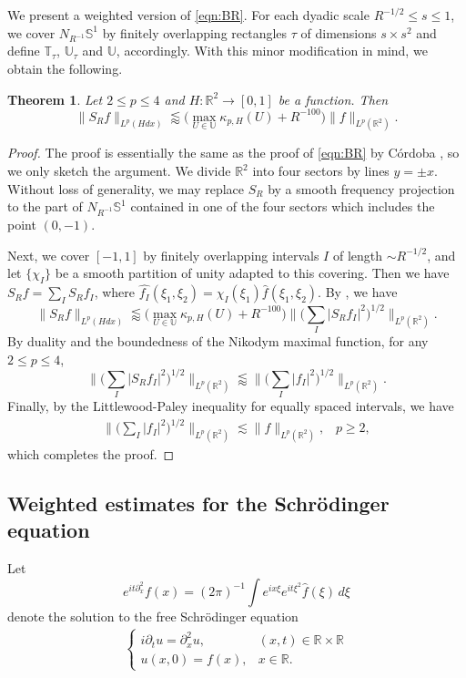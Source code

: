 \documentclass[11pt]{amsart}
\newtheorem{theorem}{Theorem}[section]
\theoremstyle{definition}
\theoremstyle{remark}
\renewcommand{\hat}{\widehat}
\newcommand{\R}{\mathbb{R}}
\newcommand{\T}{\mathbb{T}}
\newcommand{\U}{\mathbb{U}}
\newcommand{\les}{\lesssim}
\newcommand{\less}{\lessapprox}
\begin{document}
We present a weighted version of \eqref{eqn:BR}. For each dyadic scale $R^{-1/2}\leq s\leq 1$, we cover $N_{R^{-1}}\mathbb{S}^1$ by finitely overlapping rectangles $\tau$ of dimensions $s\times s^2$ and define $\T_\tau$, $\U_\tau$ and $\U$, accordingly. With this minor modification in mind, we obtain the following. 
\begin{theorem}\label{thm:BR}
Let $2\leq p\leq 4$ and $H:\R^2 \to [0,1]$ be a function. Then 
\[ 
			\| S_R f\|_{L^p(Hd x)} \less  \big(\max_{U\in \U} \kappa_{p,H}(U) + R^{-100} \big)   \| f\|_{L^p(\R^2)} .
\]	
\end{theorem}
\begin{proof}
	The proof is essentially the same as the proof of \eqref{eqn:BR}  by C\'{o}rdoba \cite{Co}, so we only  sketch the argument. We divide $\R^2$ into four sectors by lines $y=\pm x$. Without loss of generality, we may replace $S_R$ by a smooth frequency projection to the part of $N_{R^{-1}}\mathbb{S}^1$ contained in one of the four sectors which includes the point $(0,-1)$.  
	
	Next, we cover $[-1,1]$ by finitely overlapping intervals $I$ of length $\sim R^{-1/2}$, and let $\{ \chi_I\}$ be a smooth partition of unity adapted to this covering. Then we have $S_R f=\sum_{I} S_R f_I$, where $\hat{f_I}(\xi_1,\xi_2) =  \chi_I(\xi_1) \hat{f}(\xi_1,\xi_2)$. By , we have
	\[ \|S_R f\|_{L^p(Hd x)} \less   \big(\max_{U\in \U} \kappa_{p,H}(U) +R^{-100}\big) \big\| \big(\sum_I |S_R f_I|^2 \big)^{1/2}\big\|_{L^p(\R^2)}. \]
	By duality and the boundedness of the Nikodym maximal function, for any $2\leq p\leq 4$,
    \[ \big\| \big(\sum_I |S_R f_I|^2 \big)^{1/2}\big\|_{L^p(\R^2)} \less \big\| \big(\sum_I |f_I|^2 \big)^{1/2}\big\|_{L^p(\R^2)}.	\]
   Finally, by the Littlewood-Paley inequality for equally spaced intervals, we have  
	\begin{align}\label{LP}
		\big\| \big(\sum_I |f_I|^2 \big)^{1/2}\big\|_{L^p(\R^2)} \les \| f\|_{L^p(\R^2)}, \;\;\; p \geq 2,
	\end{align}
	which completes the proof.
\end{proof}

\subsection{Weighted estimates for the Schr\"odinger equation}\label{sec:etaDefn}
Let \[
e^{it\partial_x^2}f(x)
=(2\pi)^{-1}\int e^{ix\xi}e^{it\xi^2}
\widehat f(\xi)\,d\xi
\]
denote the solution to the free Schr\"odinger equation
\begin{align*}
	\begin{cases}
		i\partial_tu = \partial_x^2 u, &(x,t)\in \R \times \R \\
		u(x,0)=f(x), &x\in \R.    
	\end{cases}
\end{align*}
\end{document}
